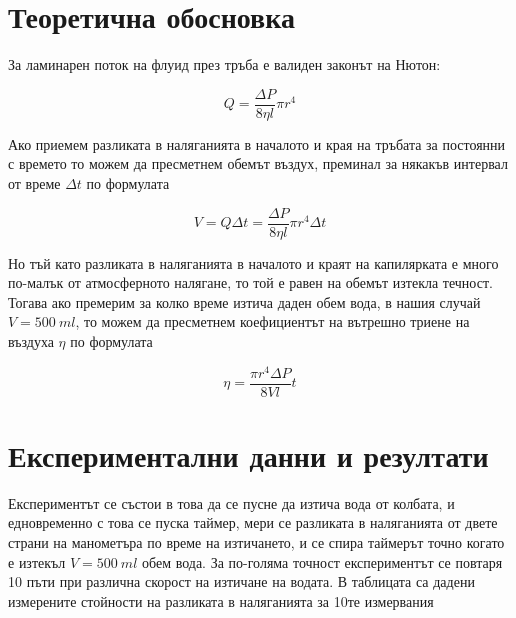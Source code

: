 \documentclass[%
 reprint,
 amsmath,amssymb,
 aps,
]{revtex4-2}
\begin{document}
\section{Теоретична обосновка}

За ламинарен поток на флуид през тръба е валиден законът на Нютон: 

\begin{equation*}
    Q = \frac{\Delta P}{8\eta l}\pi r^4
\end{equation*}

Ако приемем разликата в наляганията в началото и края на тръбата за постоянни с времето то можем да пресметнем обемът въздух, преминал за някакъв интервал от време $\Delta t$ по формулата

\begin{equation*}
    V = Q\Delta t = \frac{\Delta P}{8\eta l}\pi r^4 \Delta t
\end{equation*}

Но тъй като разликата в наляганията в началото и краят на капилярката е много по-малък от атмосферното налягане, то той е равен на обемът изтекла течност. Тогава ако премерим за колко време изтича даден обем вода, в нашия случай $V = 500 \ \si{ml}$, то можем да пресметнем коефициентът на вътрешно триене на въздуха $\eta$ по формулата 

\begin{equation*}
    \eta = \frac{\pi r^4 \Delta P}{8Vl}t \label{eq:1} \tag{1}
\end{equation*}

\section{Експериментални данни и резултати}

Експериментът се състои в това да се пусне да изтича вода от колбата, и едновременно с това се пуска таймер, мери се разликата в наляганията от двете страни на манометъра по време на изтичането, и се спира таймерът точно когато е изтекъл $V = 500 \ \si{ml}$ обем вода. За по-голяма точност експериментът се повтаря 10 пъти при различна скорост на изтичане на водата. В таблицата са дадени измерените стойности на разликата в наляганията за 10те измервания
\end{document}
